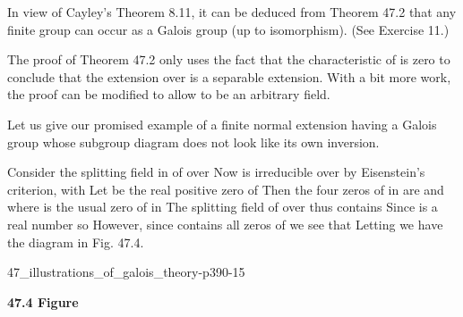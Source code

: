 \documentclass[11pt,oneside]{article}
\begin{document}
\begin{BookBody}
In view of Cayley’s Theorem 8.11, it can be deduced from Theorem 47.2 that any finite group can occur as a Galois group (up to isomorphism). (See Exercise 11.)

The proof of Theorem 47.2 only uses the fact that the characteristic of  is zero to conclude that the extension  over  is a separable extension. With a bit more work, the proof can be modified to allow  to be an arbitrary field.


\noindent Let us give our promised example of a finite normal extension having a Galois group whose subgroup diagram does not look like its own inversion.

 Consider the splitting field in  of  over  Now  is irreducible over  by Eisenstein’s criterion, with  Let  be the real positive zero of  Then the four zeros of  in  are  and  where  is the usual zero of  in  The splitting field  of  over  thus contains  Since \BookInline{\alpha } is a real number so  However, since  contains all zeros of  we see that  Letting  we have the diagram in Fig. 47.4.

\begin{BookFloat}{47_illustrations_of_galois_theory-p390-15}
\begin{center}\end{center}
\begin{center}\small \textbf{47.4 Figure}\end{center}
\end{BookFloat}


\end{BookBody}
\end{document}
